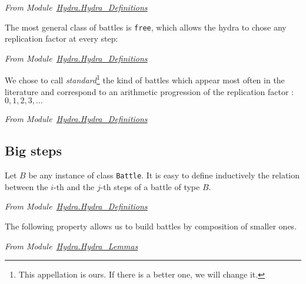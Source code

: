 \vspace{6pt}
\noindent
\emph{From Module~\href{../theories/html/hydras.Hydra.Hydra_Definitions.html}{Hydra.Hydra\_Definitions}}
\label{types:Battle}



The most general class of battles is \texttt{free}, which allows the hydra to chose any replication factor at every step:

\vspace{6pt}
\noindent
\emph{From Module~\href{../theories/html/hydras.Hydra.Hydra_Definitions.html\#free}{Hydra.Hydra\_Definitions}}



We chose to call \emph{standard}\footnote{This appellation is ours. If there is a better one, we will change it.} the kind of battles which appear  most often in the literature and correspond to an arithmetic progression of the replication factor : $0,1,2,3, \dots$


\vspace{6pt}
\noindent
\emph{From Module~\href{../theories/html/hydras.Hydra.Hydra_Definitions.html\#standard}{Hydra.Hydra\_Definitions}}




\subsection{Big steps}

Let $B$ be any instance of class \texttt{Battle}. It is easy to define inductively the relation between the $i$-th and the $j$-th steps of a battle of type $B$. 

\vspace{6pt}
\noindent\emph{From Module~\href{../theories/html/hydras.Hydra.Hydra_Definitions.html\#fight}{Hydra.Hydra\_Definitions}}



The following property allows us to build battles by composition of smaller ones.


\vspace{6pt}
\noindent\emph{From Module~\href{../theories/html/hydras.Hydra.Hydra_Lemmas.html}{Hydra.Hydra\_Lemmas}}
\noindent




